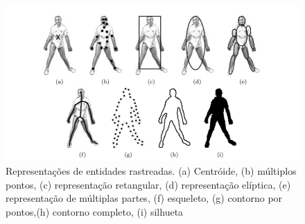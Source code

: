 	\begin{figure}[hbt]
		\begin{center}
			\includegraphics[scale=0.5]{figuras/2.FundamentacaoTeorica/representacao.png}
		\end{center}
		\caption{Representações de entidades rastreadas. (a) Centróide, (b) múltiplos pontos, (c) representação retangular, (d) representação elíptica, (e) representação de múltiplas partes, (f) esqueleto, (g) contorno por pontos,(h) contorno completo, (i) silhueta~\cite{yilmaz}}
		\label{representacao}
	\end{figure}

